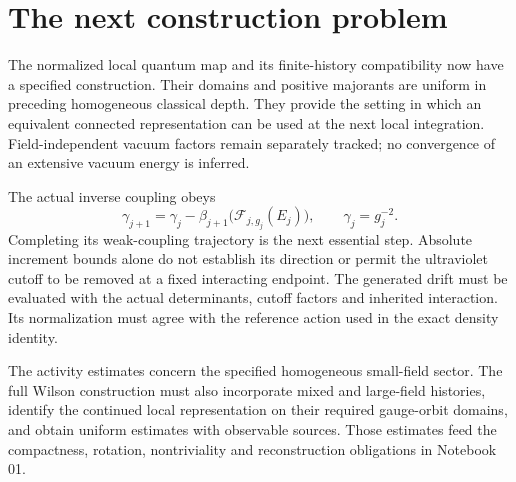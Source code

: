\documentclass[11pt]{article}
\theoremstyle{remark}
\begin{document}
\section{The next construction problem}
\label{qdn-next-section}

The normalized local quantum map and its finite-history compatibility
now have a specified construction. Their domains and positive
majorants are uniform in preceding homogeneous classical depth.
They provide the setting in which an equivalent connected
representation can be used at the next local integration.
Field-independent vacuum factors remain separately tracked;
no convergence of an extensive vacuum energy is inferred.

The actual inverse coupling obeys
\[
 \gamma_{j+1}=\gamma_j-
       \beta_{j+1}\bigl(\mathcal F_{j,g_j}(E_j)\bigr),
 \qquad \gamma_j=g_j^{-2}.
\]
Completing its weak-coupling trajectory is the next essential
step. Absolute increment bounds alone do not establish its
direction or permit the ultraviolet cutoff to be removed at a
fixed interacting endpoint. The generated drift must be evaluated
with the actual determinants, cutoff factors and inherited
interaction. Its normalization must agree with the reference
action used in the exact density identity.

The activity estimates concern the specified homogeneous
small-field sector. The full Wilson construction must also
incorporate mixed and large-field histories, identify the
continued local representation on their required gauge-orbit
domains, and obtain uniform estimates with observable sources.
Those estimates feed the compactness, rotation, nontriviality
and reconstruction obligations in Notebook 01.
\end{document}
